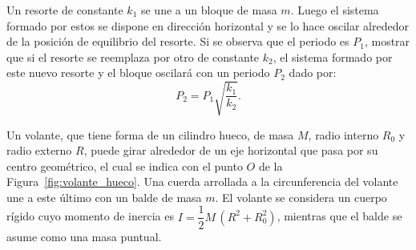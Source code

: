 \documentclass[addpoints]{exam}
\begin{document}
\begin{questions}

    \question Un resorte de constante $k_1$ se une a un bloque de masa $m$. Luego el sistema formado por estos se dispone en dirección horizontal y se lo hace oscilar alrededor de la posición de equilibrio del resorte. Si se observa que el periodo es $P_1$, mostrar que si el resorte se reemplaza por otro de constante $k_2$, el sistema formado por este nuevo resorte y el bloque oscilará con un periodo $P_2$ dado por: $$ P_2 = P_1 \sqrt{\frac{k_1}{k_2}}.$$
    
    \question \label{ej:volante_hueco} Un volante, que tiene forma de un cilindro hueco, de masa $M$, radio interno $R_0$ y radio externo $R$, puede girar alrededor de un eje horizontal que pasa por su centro geométrico, el cual se indica con el punto $O$ de la Figura~\ref{fig:volante_hueco}. Una cuerda arrollada a la circunferencia del volante une a este último con un balde de masa $m$. El volante se considera un cuerpo rígido cuyo momento de inercia es $I = \dfrac{1}{2} M \, \left(R^2 + R_0^2\right)$, mientras que el balde se asume como una masa puntual.

    \begin{figure}[ht]
        \centering
\end{figure}
\end{questions}
\end{document}
